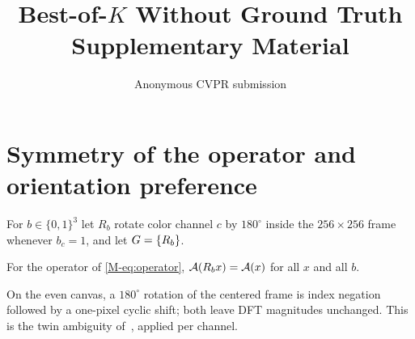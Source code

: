 \documentclass[10pt,onecolumn,letterpaper]{article}
\title{Best-of-$K$ Without Ground Truth\\Supplementary Material}
\author{Anonymous CVPR submission}
\begin{document}
\maketitle
\appendix
\renewcommand{\thesection}{S\arabic{section}}

\section{Symmetry of the operator and orientation preference}
\label{sec:suppl-symmetry}
For $b\in\{0,1\}^3$ let $R_b$ rotate color channel $c$ by $180^\circ$ inside the $256\times256$ frame whenever $b_c=1$, and let $G=\{R_b\}$.
\begin{lemma}
\label{lem:orbit}
For the operator of \cref{M-eq:operator}, $\mathcal{A}(R_b x)=\mathcal{A}(x)$ for all $x$ and all $b$.
\end{lemma}
On the even canvas, a $180^\circ$ rotation of the centered frame is index negation followed by a one-pixel cyclic shift; both leave DFT magnitudes unchanged.
This is the twin ambiguity of~\cite{hayes1982reconstruction,fienup1986stagnation}, applied per channel.







{\small}
\end{document}
